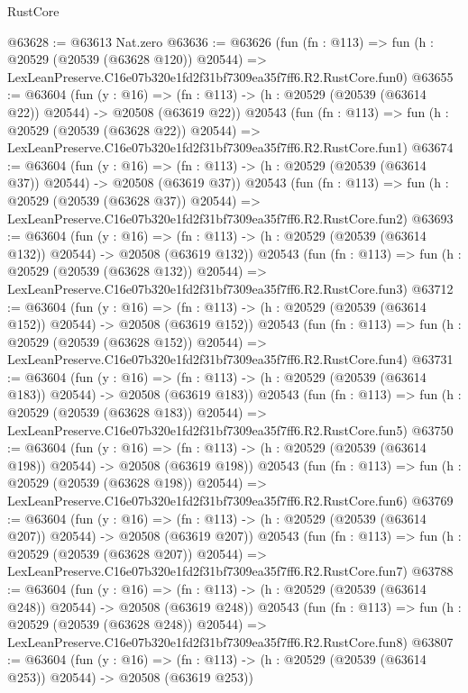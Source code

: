 \begin{lexlean}{RustCore}
\begin{coremodule}
@63628 := @63613 Nat.zero
@63636 := @63626
    (fun (fn : @113) =>
    fun (h : @20529 (@20539 (@63628 @120)) @20544) =>
    LexLeanPreserve.C16e07b320e1fd2f31bf7309ea35f7ff6.R2.RustCore.fun0)
@63655 := @63604
    (fun (y : @16) =>
    (fn : @113) -> (h : @20529 (@20539 (@63614 @22)) @20544) -> @20508 (@63619 @22))
    @20543
    (fun (fn : @113) =>
    fun (h : @20529 (@20539 (@63628 @22)) @20544) =>
    LexLeanPreserve.C16e07b320e1fd2f31bf7309ea35f7ff6.R2.RustCore.fun1)
@63674 := @63604
    (fun (y : @16) =>
    (fn : @113) -> (h : @20529 (@20539 (@63614 @37)) @20544) -> @20508 (@63619 @37))
    @20543
    (fun (fn : @113) =>
    fun (h : @20529 (@20539 (@63628 @37)) @20544) =>
    LexLeanPreserve.C16e07b320e1fd2f31bf7309ea35f7ff6.R2.RustCore.fun2)
@63693 := @63604
    (fun (y : @16) =>
    (fn : @113) -> (h : @20529 (@20539 (@63614 @132)) @20544) -> @20508 (@63619 @132))
    @20543
    (fun (fn : @113) =>
    fun (h : @20529 (@20539 (@63628 @132)) @20544) =>
    LexLeanPreserve.C16e07b320e1fd2f31bf7309ea35f7ff6.R2.RustCore.fun3)
@63712 := @63604
    (fun (y : @16) =>
    (fn : @113) -> (h : @20529 (@20539 (@63614 @152)) @20544) -> @20508 (@63619 @152))
    @20543
    (fun (fn : @113) =>
    fun (h : @20529 (@20539 (@63628 @152)) @20544) =>
    LexLeanPreserve.C16e07b320e1fd2f31bf7309ea35f7ff6.R2.RustCore.fun4)
@63731 := @63604
    (fun (y : @16) =>
    (fn : @113) -> (h : @20529 (@20539 (@63614 @183)) @20544) -> @20508 (@63619 @183))
    @20543
    (fun (fn : @113) =>
    fun (h : @20529 (@20539 (@63628 @183)) @20544) =>
    LexLeanPreserve.C16e07b320e1fd2f31bf7309ea35f7ff6.R2.RustCore.fun5)
@63750 := @63604
    (fun (y : @16) =>
    (fn : @113) -> (h : @20529 (@20539 (@63614 @198)) @20544) -> @20508 (@63619 @198))
    @20543
    (fun (fn : @113) =>
    fun (h : @20529 (@20539 (@63628 @198)) @20544) =>
    LexLeanPreserve.C16e07b320e1fd2f31bf7309ea35f7ff6.R2.RustCore.fun6)
@63769 := @63604
    (fun (y : @16) =>
    (fn : @113) -> (h : @20529 (@20539 (@63614 @207)) @20544) -> @20508 (@63619 @207))
    @20543
    (fun (fn : @113) =>
    fun (h : @20529 (@20539 (@63628 @207)) @20544) =>
    LexLeanPreserve.C16e07b320e1fd2f31bf7309ea35f7ff6.R2.RustCore.fun7)
@63788 := @63604
    (fun (y : @16) =>
    (fn : @113) -> (h : @20529 (@20539 (@63614 @248)) @20544) -> @20508 (@63619 @248))
    @20543
    (fun (fn : @113) =>
    fun (h : @20529 (@20539 (@63628 @248)) @20544) =>
    LexLeanPreserve.C16e07b320e1fd2f31bf7309ea35f7ff6.R2.RustCore.fun8)
@63807 := @63604
    (fun (y : @16) =>
    (fn : @113) -> (h : @20529 (@20539 (@63614 @253)) @20544) -> @20508 (@63619 @253))

\end{coremodule}
\end{lexlean}
